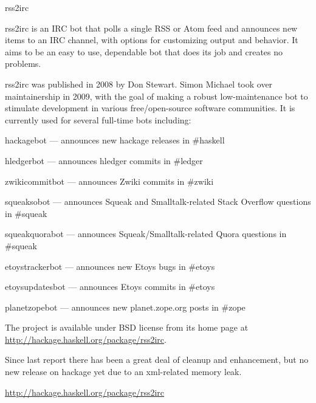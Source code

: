 \begin{hcarentry}[new]{rss2irc}
\makeheader

rss2irc is an IRC bot that polls a single RSS or Atom feed and announces
new items to an IRC channel, with options for customizing output and
behavior. It aims to be an easy to use, dependable bot that does its job
and creates no problems.

rss2irc was published in 2008 by Don Stewart. Simon Michael took over
maintainership in 2009, with the goal of making a robust low-maintenance
bot to stimulate development in various free/open-source software
communities. It is currently used for several full-time bots including:
\begin{compactitem}
\item hackagebot --- announces new hackage releases in \#haskell
\item hledgerbot --- announces hledger commits in \#ledger
\item zwikicommitbot --- announces Zwiki commits in \#zwiki
\item squeaksobot --- announces Squeak and Smalltalk-related Stack Overflow questions in \#squeak
\item squeakquorabot --- announces Squeak/Smalltalk-related Quora questions in \#squeak
\item etoystrackerbot --- announces new Etoys bugs in \#etoys
\item etoysupdatesbot --- announces Etoys commits in \#etoys
\item planetzopebot --- announces new planet.zope.org posts in \#zope
\end{compactitem}

The project is available under BSD license from its home page at
\url{http://hackage.haskell.org/package/rss2irc}. 

Since last report there has been a great deal of cleanup and
enhancement, but no new release on hackage yet due to an xml-related
memory leak.

\FurtherReading
  \url{http://hackage.haskell.org/package/rss2irc}
\end{hcarentry}
